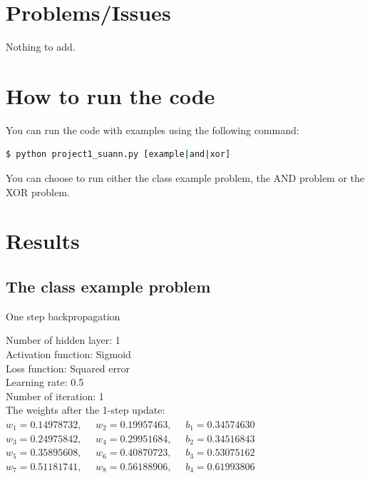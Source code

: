 \documentclass[12pt]{amsart}
\begin{document}
\section{Problems/Issues}
Nothing to add.

\section{How to run the code}

You can run the code with examples using the following command:
\begin{lstlisting}[language=bash]
$ python project1_suann.py [example|and|xor]
\end{lstlisting}

You can choose to run either the class example problem, the AND problem or the XOR problem. 


\vfill 

\pagebreak

\section{Results}
\subsection{The class example problem} One step backpropagation 

Number of hidden layer: 1 \\
Activation function: Sigmoid \\
Loss function: Squared error \\
Learning rate: 0.5 \\
Number of iteration: 1 \\

The weights after the 1-step update:\\
$ w_1 = 0.14978732, ~~~~~~ w_2 = 0.19957463, ~~~~~~ b_1 = 0.34574630$ \\
$ w_3 = 0.24975842, ~~~~~~ w_4 = 0.29951684, ~~~~~~ b_2 = 0.34516843$ \\
$ w_5 = 0.35895608, ~~~~~~ w_6 = 0.40870723, ~~~~~~ b_3 = 0.53075162$ \\
$ w_7 = 0.51181741, ~~~~~~ w_8 = 0.56188906, ~~~~~~ b_4 = 0.61993806$ \\
\end{document}
